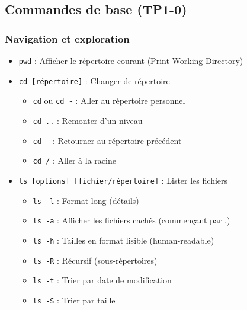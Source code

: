 \documentclass[12pt,a4paper]{article}
\begin{document}
\subsection{Commandes de base (TP1-0)}

\subsubsection{Navigation et exploration}
\begin{itemize}
    \item \texttt{pwd} : Afficher le répertoire courant (Print Working Directory)
    \item \texttt{cd [répertoire]} : Changer de répertoire
    \begin{itemize}
        \item \texttt{cd} ou \texttt{cd \textasciitilde} : Aller au répertoire personnel
        \item \texttt{cd ..} : Remonter d'un niveau
        \item \texttt{cd -} : Retourner au répertoire précédent
        \item \texttt{cd /} : Aller à la racine
    \end{itemize}
    \item \texttt{ls [options] [fichier/répertoire]} : Lister les fichiers
    \begin{itemize}
        \item \texttt{ls -l} : Format long (détails)
        \item \texttt{ls -a} : Afficher les fichiers cachés (commençant par .)
        \item \texttt{ls -h} : Tailles en format lisible (human-readable)
        \item \texttt{ls -R} : Récursif (sous-répertoires)
        \item \texttt{ls -t} : Trier par date de modification
        \item \texttt{ls -S} : Trier par taille
    \end{itemize}
\end{itemize}
\end{document}
